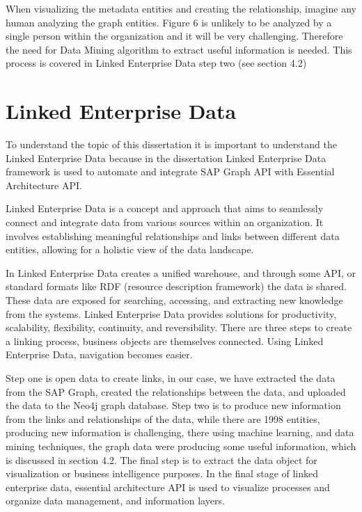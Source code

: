 \documentclass{article}
\begin{document}
When visualizing the metadata entities and creating the relationship, imagine any human analyzing the graph entities. Figure 6 is unlikely to be analyzed by a single person within the organization and it will be very challenging. Therefore the need for Data Mining algorithm to extract useful information is needed. This process is covered in Linked Enterprise Data step two (see section 4.2) 


\clearpage
\maketitle
\section{Linked Enterprise Data}
To understand the topic of this dissertation it is important to understand the Linked Enterprise Data because in the dissertation Linked Enterprise Data framework is used to automate and integrate SAP Graph API with Essential Architecture API.

Linked Enterprise Data is a concept and approach that aims to seamlessly connect and integrate data from various sources within an organization. It involves establishing meaningful relationships and links between different data entities, allowing for a holistic view of the data landscape.

In Linked Enterprise Data creates a unified warehouse, and through some API, or standard formats like RDF (resource description framework) the data is shared. These data are exposed for searching, accessing, and extracting new knowledge from the systems. Linked Enterprise Data provides solutions for productivity, scalability, flexibility, continuity, and reversibility. There are three steps to create a linking process, business objects are themselves connected. Using Linked Enterprise Data, navigation becomes easier. \parencite{rao2017}

Step one is open data to create links, in our case, we have extracted the data from the SAP Graph, created the relationships between the data, and uploaded the data to the Neo4j graph database. Step two is to produce new information from the links and relationships of the data, while there are 1998 entities, producing new information is challenging, there using machine learning, and data mining techniques, the graph data were producing some useful information, which is discussed in section 4.2. The final step is to extract the data object for visualization or business intelligence purposes. In the final stage of linked enterprise data, essential architecture API is used to visualize processes and organize data management, and information layers.
\end{document}
